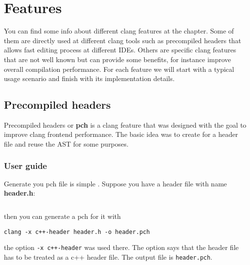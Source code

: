 \chapter{Features}

You can find some info about different clang features at the chapter. Some of
them are directly used at different clang tools such as precompiled headers that
allows fast editing process at different IDEs. Others are specific clang
features that are not well known but can provide some benefits, for instance
improve overall compilation performance. For each feature we will start with a
typical usage scenario and finish with its implementation details.

\section{Precompiled headers}
Precompiled headers or \textbf{pch} is a clang feature that was
designed with the goal to improve clang frontend performance. The
basic idea was to create  for a header file and reuse the AST for
some purposes.

\subsection{User guide}
Generate you pch file is simple \cite{clang:user_manual}. Suppose you have a header file with
name \textbf{header.h}:
\inputminted{c++}{./src/pch/simple/header.h} then you can generate a pch for it with
\begin{verbatim}
clang -x c++-header header.h -o header.pch
\end{verbatim}
the option \texttt{-x c++-header} was used there. The option says that
the header file has to be treated as a c++ header file. The output
file is \texttt{header.pch}.

